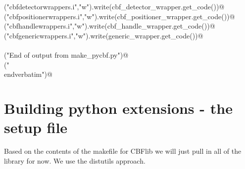 \documentclass[10pt,a4paper,twoside,notitlepage]{article}
\begin{document}
\begin{flushleft}
\begin{list}{}{}
\mbox{}\verb@open("cbfdetectorwrappers.i","w").write(cbf_detector_wrapper.get_code())@\\
\mbox{}\verb@open("cbfpositionerwrappers.i","w").write(cbf_positioner_wrapper.get_code())@\\
\mbox{}\verb@open("cbfhandlewrappers.i","w").write(cbf_handle_wrapper.get_code())@\\
\mbox{}\verb@open("cbfgenericwrappers.i","w").write(generic_wrapper.get_code())@\\
\mbox{}\verb@@\\
\mbox{}\verb@print("End of output from make_pycbf.py")@\\
\mbox{}\verb@print("\\end{verbatim}")@\\
\mbox{}\verb@@{\NWsep}
\end{list}
\vspace{-1.5ex}
\footnotesize
\begin{list}{}{\setlength{\itemsep}{-\parsep}\setlength{\itemindent}{-\leftmargin}}

\item{}
\end{list}
\vspace{4ex}
\end{flushleft}
\section{Building python extensions - the setup file}


Based on the contents of the makefile for CBFlib we will just 
pull in all of the library for now. We use the distutils approach.
\end{document}
